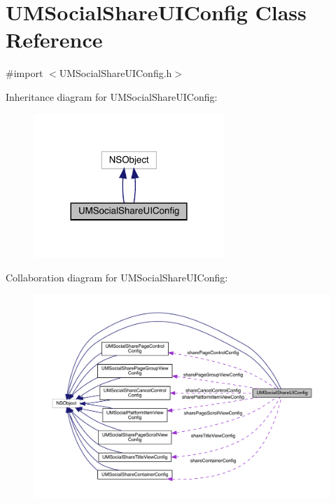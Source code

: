 \hypertarget{interface_u_m_social_share_u_i_config}{}\section{U\+M\+Social\+Share\+U\+I\+Config Class Reference}
\label{interface_u_m_social_share_u_i_config}


{\ttfamily \#import $<$U\+M\+Social\+Share\+U\+I\+Config.\+h$>$}



Inheritance diagram for U\+M\+Social\+Share\+U\+I\+Config\+:\nopagebreak
\begin{figure}[H]
\begin{center}
\leavevmode
\includegraphics[width=204pt]{interface_u_m_social_share_u_i_config__inherit__graph}
\end{center}
\end{figure}


Collaboration diagram for U\+M\+Social\+Share\+U\+I\+Config\+:\nopagebreak
\begin{figure}[H]
\begin{center}
\leavevmode
\includegraphics[width=350pt]{interface_u_m_social_share_u_i_config__coll__graph}
\end{center}
\end{figure}

